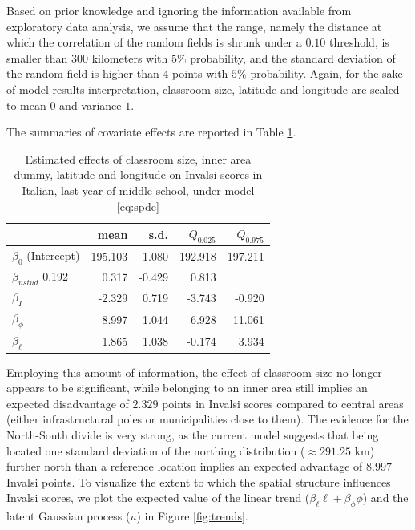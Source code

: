 \documentclass[openany]{book}
\begin{document}
Based on prior knowledge and ignoring the information available from exploratory data analysis, we assume that the range, namely the distance at which the correlation of the random fields is shrunk under a $0.10$ threshold, is smaller than $300$ kilometers with $5\%$ probability, and the standard deviation of the random field is higher than $4$ points with $5\%$ probability. Again, for the sake of model results interpretation, classroom size, latitude and longitude are scaled to mean $0$ and variance $1$. 

 




The summaries of covariate effects are reported in Table \ref{tab:betaSP}.
%
 \begin{table}
 \centering
\begin{tabular}{lrrrr}
 & mean & s.d. & $Q_{0.025}$ & $Q_{0.975}$ \\
 \hline
 $\beta_0$ (Intercept) & 195.103 & 1.080 & 192.918 & 197.211 \\  
 $\beta_{nstud}$ 0.192 & 0.317 & -0.429 & 0.813 \\ 
 $\beta_I$ & -2.329 & 0.719 & -3.743 & -0.920 \\ 
 $\beta_{\phi}$ & 8.997 & 1.044 & 6.928 & 11.061 \\ 
 $\beta_{\ell}$ &  1.865 & 1.038 & -0.174 & 3.934 \\ 
 \hline
\end{tabular}
\caption{Estimated effects of classroom size, inner area dummy, latitude and longitude on Invalsi scores in Italian, last year of middle school, under model \ref{eq:spde}}
\label{tab:betaSP}
\end{table}
%
Employing this amount of information, the effect of classroom size no longer appears to be significant, while belonging to an inner area still implies an expected disadvantage of $2.329 $ points in Invalsi scores compared to central areas (either infrastructural poles or municipalities close to them). The evidence for the North-South divide is very strong, as the current model suggests that being located one standard deviation of the northing distribution ($\approx 291.25$ km) further north than a reference location implies an expected advantage of $8.997$ Invalsi points. To visualize the extent to which the spatial structure influences Invalsi scores, we plot the expected value of the linear trend ($\beta_\ell \ell + \beta_\phi \phi$) and the latent Gaussian process ($u$) in Figure \ref{fig:trends}.
\end{document}
